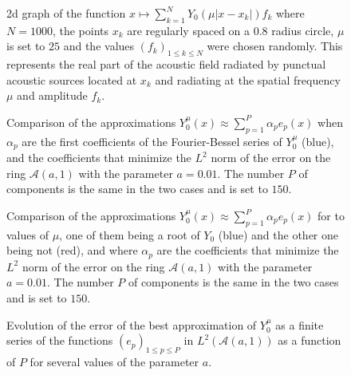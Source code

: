\documentclass[11pt,a4paper]{article}
\begin{document}
\begin{figure}[H]
\centering

\caption{2d graph of the function $x \mapsto \sum_{k=1}^N Y_0(\mu|x - x_k|)f_k$ where $N = 1000$, the points $x_k$ are regularly spaced on a $0.8$ radius circle, $\mu$ is set to $25$ and the values $(f_k)_{1\leq k \leq N}$ were chosen randomly. This represents the real part of the acoustic field radiated by punctual acoustic sources located at $x_k$ and radiating at the spatial frequency $\mu$ and amplitude $f_k$.}
\label{CircleHelmholtz4}
\end{figure}

\begin{figure}[H]
\centering
\subfigure[Logarithmic error $e = \log\left(\left|Y_0^\mu(x) - \displaystyle\sum_{p=1}^P \alpha_p e_p(x)\right|\right)$]{\label{fig:compareY01}}
\caption{Comparison of the approximations $Y_0^\mu(x) \approx \displaystyle\sum_{p=1}^P \alpha_p e_p(x)$ when $\alpha_p$ are the first coefficients of the Fourier-Bessel series of $Y_0^\mu$ (blue), and the coefficients that minimize the $L^2$ norm of the error on the ring $\mathcal{A}(a,1)$ with the parameter $a = 0.01$. The number $P$ of components is the same in the two cases and is set to $150$. }
\label{compareY0}
\end{figure}

\begin{figure}

\centering

\caption{Comparison of the approximations $Y_0^\mu(x) \approx \displaystyle\sum_{p=1}^P \alpha_p e_p(x)$ for to values of $\mu$, one of them being a root of $Y_0$ (blue) and the other one being not (red), and where $\alpha_p$ are the coefficients that minimize the $L^2$ norm of the error on the ring $\mathcal{A}(a,1)$ with the parameter $a = 0.01$. The number $P$ of components is the same in the two cases and is set to $150$. }
\label{cool}
\end{figure}

\begin{figure}
\centering

\caption{Evolution of the error of the best approximation of $Y_0^\mu$ as a finite series of the functions $(e_p)_{1\leq p \leq P}$ in $L^2(\mathcal{A}(a,1))$ as a function of $P$ for several values of the parameter $a$.}
\label{FigureCompareAHelmholtz}
\end{figure}
\end{document}
